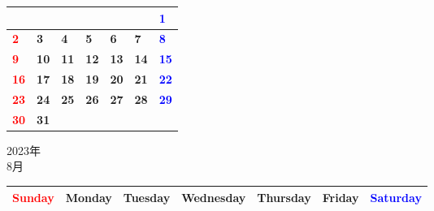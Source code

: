 \documentclass[a4paper,landscape]{jsarticle}
\newcommand{\dig}{\hspace{29mm}}
\newcommand{\tdig}{\hspace{27mm}}
\newcommand{\LBF}{\LARGE\textbf}
\begin{document}
\begingroup
\renewcommand{\arraystretch}{4}
\begin{tabular}{|p{32mm}|p{32mm}|p{32mm}|p{32mm}|p{32mm}|p{32mm}|p{32mm}|}
\hline
&&&&&&\raisebox{30pt} {\dig\textcolor{blue}{\LBF{1}}}\\
\hline
\raisebox{30pt} {\dig\textcolor{red}{\LBF{2}}}&\raisebox{30pt} {\dig\LBF{3}}&\raisebox{30pt} {\dig\LBF{4}}&\raisebox{30pt} {\dig\LBF{5}}&\raisebox{30pt} {\dig\LBF{6}}&\raisebox{30pt} {\dig\LBF{7}}&\raisebox{30pt} {\dig\textcolor{blue}{\LBF{8}}}\\
\hline
\raisebox{30pt} {\dig\textcolor{red}{\LBF{9}}}&\raisebox{30pt} {\tdig\LBF{10}}&\raisebox{30pt} {\tdig\LBF{11}}&\raisebox{30pt} {\tdig\LBF{12}}&\raisebox{30pt} {\tdig\LBF{13}}&\raisebox{30pt} {\tdig\LBF{14}}&\raisebox{30pt} {\tdig\textcolor{blue}{\LBF{15}}}\\
\hline
\raisebox{30pt} {\tdig\textcolor{red}{\LBF{16}}}&\raisebox{30pt} {\tdig\LBF{17}}&\raisebox{30pt} {\tdig\LBF{18}}&\raisebox{30pt} {\tdig\LBF{19}}&\raisebox{30pt} {\tdig\LBF{20}}&\raisebox{30pt} {\tdig\LBF{21}}&\raisebox{30pt} {\tdig\textcolor{blue}{\LBF{22}}}\\
\hline
\raisebox{30pt} {\tdig\textcolor{red}{\LBF{23}}}&\raisebox{30pt} {\tdig\LBF{24}}&\raisebox{30pt} {\tdig\LBF{25}}&\raisebox{30pt} {\tdig\LBF{26}}&\raisebox{30pt} {\tdig\LBF{27}}&\raisebox{30pt} {\tdig\LBF{28}}&\raisebox{30pt} {\tdig\textcolor{blue}{\LBF{29}}}\\
\hline
\raisebox{30pt} {\tdig\textcolor{red}{\LBF{30}}}&\raisebox{30pt} {\tdig\LBF{31}}&&&&&\\
\hline
\end{tabular}
\endgroup

\newpage

\begin{center}
	\LARGE 2023年\\
	\LARGE 8月
\end{center}

\begingroup
\renewcommand{\arraystretch}{1.4}
\begin{tabular}{|>{\centering\arraybackslash}p{32mm}|>{\centering\arraybackslash}p{32mm}|>{\centering\arraybackslash}p{32mm}|>{\centering\arraybackslash}p{32mm}|>{\centering\arraybackslash}p{32mm}|>{\centering\arraybackslash}p{32mm}|>{\centering\arraybackslash}p{32mm}|}
\hline
\textcolor{red}{\large Sunday}&\large Monday&\large Tuesday&\large Wednesday&\large Thursday&\large Friday&\textcolor{blue}{\large Saturday}\\
\hline
\end{tabular}
\endgroup
\end{document}
